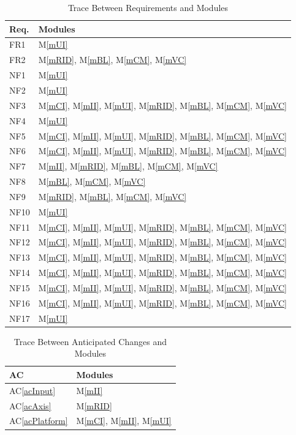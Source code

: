 \documentclass[12pt, titlepage]{article}
\newcommand{\acref}[1]{AC\ref{#1}}
\newcommand{\mref}[1]{M\ref{#1}}
\begin{document}
\begin{table}[H]
\centering
\begin{tabular}{p{} p{}}
\toprule
\textbf{Req.} & \textbf{Modules}\\
\midrule
FR1 & \mref{mUI}  \\
FR2 & \mref{mRID}, \mref{mBL}, \mref{mCM}, \mref{mVC}\\
NF1 &  \mref{mUI}  \\
NF2 & \mref{mUI}  \\
NF3 & \mref{mCI}, \mref{mII}, \mref{mUI}, \mref{mRID}, \mref{mBL}, \mref{mCM}, \mref{mVC}\\
NF4 & \mref{mUI}  \\
NF5 & \mref{mCI}, \mref{mII}, \mref{mUI}, \mref{mRID}, \mref{mBL}, \mref{mCM}, \mref{mVC}\\
NF6 & \mref{mCI}, \mref{mII}, \mref{mUI}, \mref{mRID}, \mref{mBL}, \mref{mCM}, \mref{mVC}\\
NF7 & \mref{mII}, \mref{mRID}, \mref{mBL}, \mref{mCM}, \mref{mVC}\\
NF8 & \mref{mBL}, \mref{mCM}, \mref{mVC}\\
NF9 & \mref{mRID}, \mref{mBL}, \mref{mCM}, \mref{mVC}\\
NF10 & \mref{mUI}  \\
NF11 & \mref{mCI}, \mref{mII}, \mref{mUI}, \mref{mRID}, \mref{mBL}, \mref{mCM}, \mref{mVC}\\
NF12 & \mref{mCI}, \mref{mII}, \mref{mUI}, \mref{mRID}, \mref{mBL}, \mref{mCM}, \mref{mVC}\\
NF13 & \mref{mCI}, \mref{mII}, \mref{mUI}, \mref{mRID}, \mref{mBL}, \mref{mCM}, \mref{mVC}\\
NF14 & \mref{mCI}, \mref{mII}, \mref{mUI}, \mref{mRID}, \mref{mBL}, \mref{mCM}, \mref{mVC}\\
NF15 & \mref{mCI}, \mref{mII}, \mref{mUI}, \mref{mRID}, \mref{mBL}, \mref{mCM}, \mref{mVC}\\
NF16 & \mref{mCI}, \mref{mII}, \mref{mUI}, \mref{mRID}, \mref{mBL}, \mref{mCM}, \mref{mVC}\\
NF17 &\mref{mUI}  \\
\bottomrule
\end{tabular}
\caption{Trace Between Requirements and Modules}
\label{TblRT}
\end{table}

\begin{table}[H]
\centering
\begin{tabular}{p{} p{}}
\toprule
\textbf{AC} & \textbf{Modules}\\
\midrule
\acref{acInput} & \mref{mII}\\
\acref{acAxis} & \mref{mRID}\\
\acref{acPlatform} & \mref{mCI}, \mref{mII}, \mref{mUI} \\
\bottomrule
\end{tabular}
\caption{Trace Between Anticipated Changes and Modules}
\label{TblACT}
\end{table}
\end{document}

